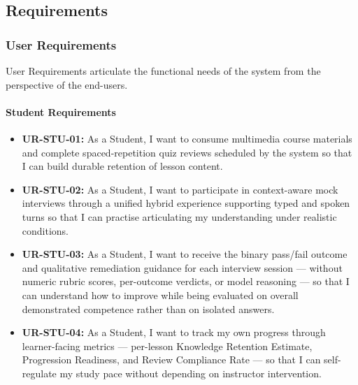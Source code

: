 ﻿\subsection{Requirements}
\subsubsection{User Requirements}
User Requirements articulate the functional needs of the system from the perspective of the end-users.

\paragraph{Student Requirements}
\begin{itemize}
    \item \textbf{UR-STU-01:} As a Student, I want to consume multimedia course materials and complete spaced-repetition quiz reviews scheduled by the system so that I can build durable retention of lesson content.
    \item \textbf{UR-STU-02:} As a Student, I want to participate in context-aware mock interviews through a unified hybrid experience supporting typed and spoken turns so that I can practise articulating my understanding under realistic conditions.
    \item \textbf{UR-STU-03:} As a Student, I want to receive the binary pass/fail outcome and qualitative remediation guidance for each interview session --- without numeric rubric scores, per-outcome verdicts, or model reasoning --- so that I can understand how to improve while being evaluated on overall demonstrated competence rather than on isolated answers.
    \item \textbf{UR-STU-04:} As a Student, I want to track my own progress through learner-facing metrics --- per-lesson Knowledge Retention Estimate, Progression Readiness, and Review Compliance Rate --- so that I can self-regulate my study pace without depending on instructor intervention.
\end{itemize}

